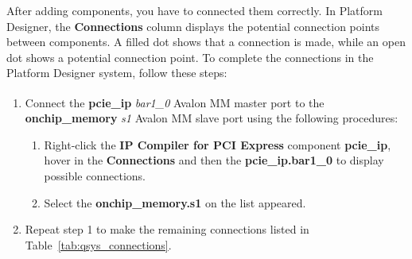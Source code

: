 \documentclass[11pt, twoside, pdftex]{article}
\begin{document}
After adding components, you have to connected them correctly. In Platform Designer, the {\bf Connections} column displays the potential connection points between components. A filled dot shows that a connection is made, while an open dot shows a potential connection point. To complete the connections in the Platform Designer system, follow these steps:

\begin{enumerate}
	\item Connect the {\bf pcie\_ip} {\it bar1\_0} Avalon\textsuperscript{\textregistered} MM master port to the {\bf onchip\_memory} {\it s1} Avalon MM slave port using the following procedures:
	
\begin{enumerate}
	\item Right-click the {\bf IP Compiler for PCI Express} component {\bf pcie\_ip}, hover in the {\bf Connections} and then the {\bf pcie\_ip.bar1\_0} to display possible connections. 
	\item Select the {\bf onchip\_memory.s1} on the list appeared.
\end{enumerate}

	\item Repeat step 1 to make the remaining connections listed in Table~\ref{tab:qsys_connections}.
	

\end{enumerate}
\end{document}
